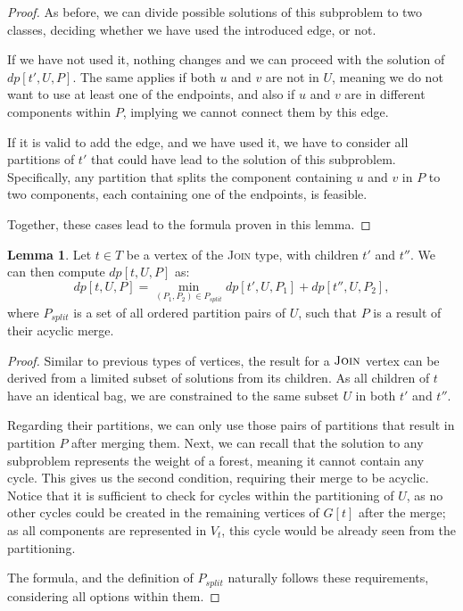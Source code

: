 \documentclass[thesis=M,english,hidelinks]{FITthesis}[2012/10/20]
\theoremstyle{definition}
\newtheorem{lemma}{Lemma}
\begin{document}
\begin{proof}
    As before, we can divide possible solutions of this subproblem to two classes, deciding whether we have used the
    introduced edge, or not.

    If we have not used it, nothing changes and we can proceed with the solution of $dp[t', U, P]$. The same
    applies if both $u$ and $v$ are not in $U$, meaning we do not want to use at least one of the endpoints, and
    also if $u$ and $v$ are in different components within $P$, implying we cannot connect them by this
    edge.

    If it is valid to add the edge, and we have used it, we have to consider all partitions of $t'$ that could have lead
    to the solution of this subproblem. Specifically, any partition that splits the component containing $u$ and $v$ in
    $P$ to two components, each containing one of the endpoints, is feasible. 

    Together, these cases lead to the formula proven in this lemma.
\end{proof}

\begin{lemma}
    Let $t \in T$ be a vertex of the \textsc{Join} type, with children $t'$ and $t''$.  We can then compute $dp[t, U,
    P]$ as:
    $$
    dp[t, U, P] = \min_{(P_1, P_2) \in P_{split}} dp[t', U, P_1] +
    dp[t'', U, P_2],
    $$
    where $P_{split}$ is a set of all ordered partition pairs of $U$, such that $P$ is a result of their
    acyclic merge.
\end{lemma}

\begin{proof}
    Similar to previous types of vertices, the result for a $\textsc{Join}$ vertex can be derived from a limited subset
    of solutions from its children. As all children of $t$ have an identical bag, we are constrained to the same subset
    $U$ in both $t'$ and $t''$.

    Regarding their partitions, we can only use those pairs of partitions that result in partition $P$ after merging
    them.  Next, we can recall that the solution to any subproblem represents the weight of a forest, meaning it cannot
    contain any cycle. This gives us the second condition, requiring their merge to be acyclic. Notice that it is
    sufficient to check for cycles within the partitioning of $U$, as no other cycles could be created in the remaining
    vertices of $G[t]$ after the merge; as all components are represented in $V_t$, this cycle would be already seen
    from the partitioning.

    The formula, and the definition of $P_{split}$ naturally follows these requirements, considering all
    options within them.
\end{proof}
\end{document}
